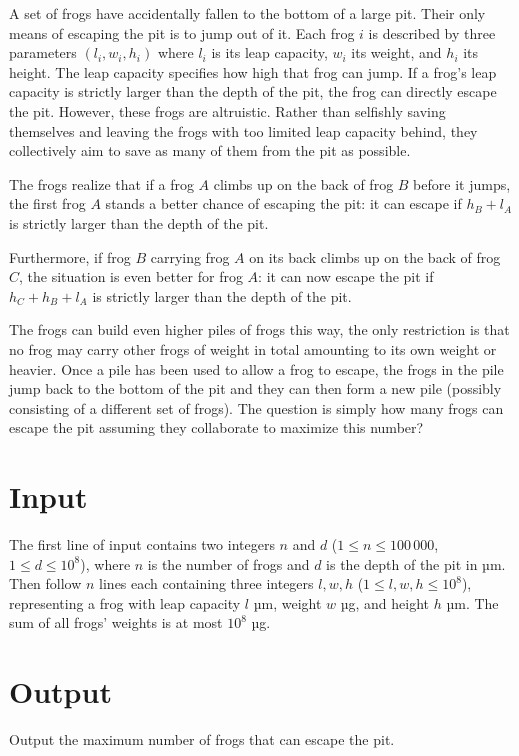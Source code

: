 %
\noindent
A set of frogs have accidentally fallen to the bottom of a large
pit. Their only means of escaping the pit is to jump out of it. Each
frog $i$ is described by three parameters $(l_i,w_i,h_i)$ where $l_i$
is its leap capacity, $w_i$ its weight, and $h_i$ its height.  The
leap capacity specifies how high that frog can jump. If a frog's leap
capacity is strictly larger than the depth of the pit, the frog can directly
escape the pit. However, these frogs are altruistic. Rather than
selfishly saving themselves and leaving the frogs with too limited leap
capacity behind, they collectively aim to save as many of them from
the pit as possible.

The frogs realize that if a frog $A$ climbs up on the back of frog $B$
before it jumps, the first frog $A$ stands a better chance of escaping
the pit: it can escape if $h_B+l_A$ is strictly larger than the depth of the
pit.

Furthermore, if frog $B$ carrying frog $A$ on its back climbs up on the back of frog $C$, the situation is even better for frog $A$: it can now escape the pit if $h_C+h_B+l_A$ is strictly larger than the depth of the pit.

The frogs can build even higher piles of frogs this way, the only
restriction is that no frog may carry other frogs of weight in total
amounting to its own weight or heavier.
Once a pile has been used to allow a frog to escape, the frogs in the pile jump back to the bottom of the pit and they can then form a new pile (possibly consisting of a different set of frogs).
The question is simply how
many frogs can escape the pit assuming they collaborate to maximize
this number?

\section*{Input}

The first line of input contains two integers $n$ and $d$ ($1 \le n \leq 100\,000$, $1 \le d \le 10^8$), where $n$ is the number of frogs and $d$ is the depth of the pit in µm. Then follow $n$ lines each containing three integers $l, w, h$ ($1 \le l, w, h \le 10^8$), representing a frog with leap capacity $l$ µm, weight $w$ µg, and height $h$ µm. The sum of all frogs' weights is at most $10^8$ µg.


\section*{Output}

Output the maximum number of frogs that can escape the pit.
